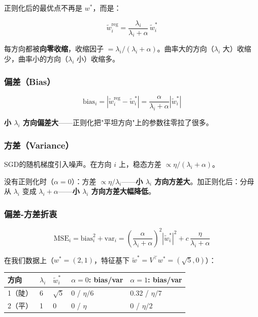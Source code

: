 \documentclass[12pt,a4paper]{article}
\begin{document}
正则化后的最优点不再是 $w^*$，而是：

\[\tilde{w}^{\text{reg}}_i = \frac{\lambda_i}{\lambda_i + \alpha}\,\tilde{w}^*_i\]

每方向都被\textbf{向零收缩}，收缩因子 $= \lambda_i/(\lambda_i + \alpha)$。曲率大的方向（$\lambda_i$ 大）收缩少，曲率小的方向（$\lambda_i$ 小）收缩多。

\subsubsection{偏差（Bias）}

\[\text{bias}_i = |\tilde{w}^{\text{reg}}_i - \tilde{w}^*_i| = \frac{\alpha}{\lambda_i + \alpha}|\tilde{w}^*_i|\]

\textbf{小 $\lambda_i$ 方向偏差大}——正则化把"平坦方向"上的参数往零拉了很多。

\subsubsection{方差（Variance）}

SGD的随机梯度引入噪声。在方向 $i$ 上，稳态方差 $\propto \eta/(\lambda_i + \alpha)$。

没有正则化时（$\alpha=0$）：方差 $\propto \eta/\lambda_i$——\textbf{小 $\lambda_i$ 方向方差大}。加正则化后：分母从 $\lambda_i$ 变成 $\lambda_i + \alpha$——\textbf{小 $\lambda_i$ 方向方差大幅降低}。

\subsubsection{偏差-方差折衷}

\[\text{MSE}_i = \text{bias}_i^2 + \text{var}_i = \left(\frac{\alpha}{\lambda_i+\alpha}\right)^2 |\tilde{w}^*_i|^2 + c\,\frac{\eta}{\lambda_i+\alpha}\]

在我们数据上（$w^* = (2,1)$，特征基下 $\tilde{w}^* = V^\top w^* = (\sqrt{5}, 0)$）：

\begin{center}\small
\begin{longtable}{|l|l|l|l|l|}
\hline
方向 & $\lambda_i$ & $\tilde{w}^*_i$ & $\alpha=0$: bias/var & $\alpha=1$: bias/var \\
\hline
1（陡） & 6 & $\sqrt{5}$ & $0$ / $\eta/6$ & $0.32$ / $\eta/7$ \\
2（平） & 1 & $0$ & $0$ / $\eta$ & $0$ / $\eta/2$ \\
\hline
\end{longtable}
\end{center}
\end{document}
